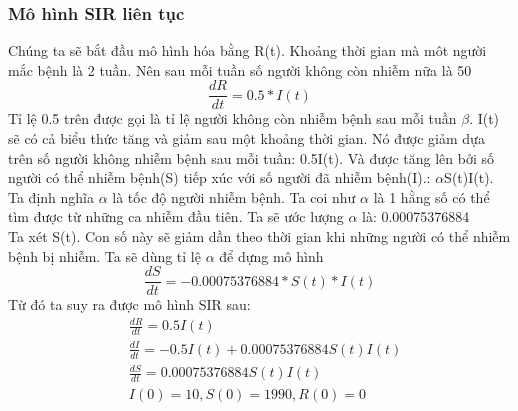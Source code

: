 \documentclass[a4paper]{article}
\begin{document}
\subsubsection{Mô hình SIR liên tục}
Chúng ta sẽ bắt đầu mô hình hóa bằng R(t). Khoảng thời gian mà môt người mắc bệnh là 2 tuần. Nên sau mỗi tuần số người không còn nhiễm nữa là 50%
\begin{equation}
\frac{dR}{dt} = 0.5*I(t)
\end{equation}
Tỉ lệ 0.5 trên được gọi là tỉ lệ người không còn nhiễm bệnh sau mỗi tuần $\beta$.
I(t) sẽ có cả biểu thức tăng và giảm sau một khoảng thời gian. Nó được giảm dựa trên số người không nhiễm bệnh sau mỗi tuần: 0.5I(t). Và được tăng lên bởi số người có thể nhiễm bệnh(S) tiếp xúc với số người đã nhiễm bệnh(I).: $\alpha$S(t)I(t). Ta định nghĩa $\alpha$ là tốc độ người nhiễm bệnh. Ta coi như $\alpha$ là 1 hằng số có thể tìm được từ những ca nhiễm đầu tiên. Ta sẽ ước lượng $\alpha$ là: 0.00075376884
\\
Ta xét S(t). Con số này sẽ giảm dần theo thời gian khi những người có thể nhiễm bệnh bị nhiễm. Ta sẽ dùng tỉ lệ $\alpha$ để dựng mô hình
\begin{equation}
\frac{dS}{dt} = -0.00075376884*S(t)*I(t)
\end{equation}
Từ đó ta suy ra được mô hình SIR sau:
\begin{equation}
\begin{split}
&\frac{dR}{dt} = 0.5I(t) \\
&\frac{dI}{dt} = -0.5I(t) + 0.00075376884S(t)I(t) \\
&\frac{dS}{dt} = 0.00075376884S(t)I(t) \\
&I(0) = 10, S(0) = 1990, R(0) = 0
\end{split}
\end{equation} 
\end{document}
